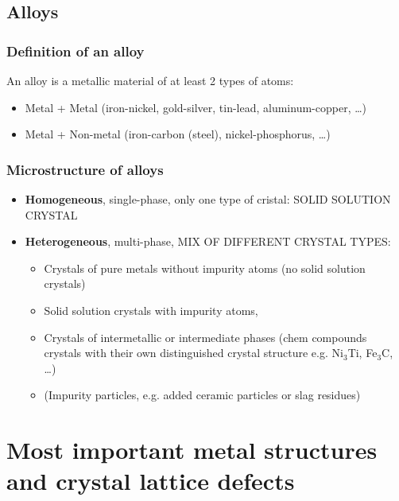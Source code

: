 \documentclass{article}
\begin{document}
\newpage
\subsection{Alloys}
\subsubsection{Definition of an alloy}
An alloy is a metallic material of at least 2 types of atoms:
\begin{itemize}
  \item Metal + Metal (iron-nickel, gold-silver, tin-lead, aluminum-copper, \dots)
  \item Metal + Non-metal (iron-carbon (steel), nickel-phosphorus, \dots)
\end{itemize}

\subsubsection{Microstructure of alloys}
\begin{itemize}
  \item \textbf{Homogeneous}, single-phase, only one type of cristal: SOLID SOLUTION CRYSTAL
  \item \textbf{Heterogeneous}, multi-phase, MIX OF DIFFERENT CRYSTAL TYPES:
  \begin{itemize}
    \item Crystals of pure metals without impurity atoms (no solid solution crystals)
    \item Solid solution crystals with impurity atoms,
    \item Crystals of intermetallic or intermediate phases (chem compounds crystals with their own distinguished crystal structure e.g. Ni$_3$Ti, Fe$_3$C, \dots)
    \item (Impurity particles, e.g. added ceramic particles or slag residues)
  \end{itemize}
\end{itemize}

\newpage
\section{Most important metal structures and crystal lattice defects}




\newpage

\end{document}

